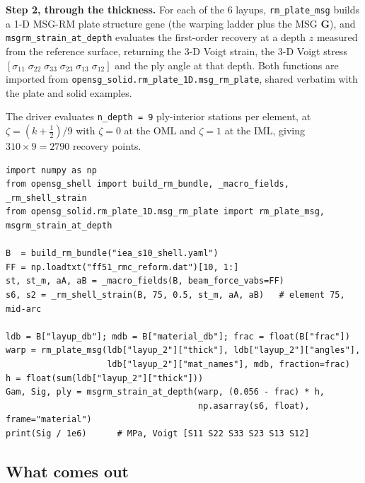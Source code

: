\textbf{Step 2, through the thickness.} For each of the 6 layups,
\texttt{rm\_plate\_msg} builds a 1-D MSG-RM plate structure gene (the warping
ladder plus the MSG $\mathbf{G}$), and \texttt{msgrm\_strain\_at\_depth}
evaluates the first-order recovery at a depth $z$ measured from the reference
surface, returning the 3-D Voigt strain, the 3-D Voigt stress
$[\sigma_{11}\;\sigma_{22}\;\sigma_{33}\;\sigma_{23}\;\sigma_{13}\;\sigma_{12}]$
and the ply angle at that depth. Both functions are imported from
\texttt{opensg\_solid.rm\_plate\_1D.msg\_rm\_plate}, shared verbatim with the
plate and solid examples.

The driver evaluates \texttt{n\_depth = 9} ply-interior stations per element, at
$\zeta = (k + \tfrac12)/9$ with $\zeta = 0$ at the OML and $\zeta = 1$ at the
IML, giving $310 \times 9 = 2790$ recovery points.

\begin{lstlisting}[style=opensg,caption={The recovery chain in miniature: one element, one depth.},basicstyle=\ttfamily\footnotesize]
import numpy as np
from opensg_shell import build_rm_bundle, _macro_fields, _rm_shell_strain
from opensg_solid.rm_plate_1D.msg_rm_plate import rm_plate_msg, msgrm_strain_at_depth

B  = build_rm_bundle("iea_s10_shell.yaml")
FF = np.loadtxt("ff51_rmc_reform.dat")[10, 1:]
st, st_m, aA, aB = _macro_fields(B, beam_force_vabs=FF)
s6, s2 = _rm_shell_strain(B, 75, 0.5, st_m, aA, aB)   # element 75, mid-arc

ldb = B["layup_db"]; mdb = B["material_db"]; frac = float(B["frac"])
warp = rm_plate_msg(ldb["layup_2"]["thick"], ldb["layup_2"]["angles"],
                    ldb["layup_2"]["mat_names"], mdb, fraction=frac)
h = float(sum(ldb["layup_2"]["thick"]))
Gam, Sig, ply = msgrm_strain_at_depth(warp, (0.056 - frac) * h,
                                      np.asarray(s6, float), frame="material")
print(Sig / 1e6)      # MPa, Voigt [S11 S22 S33 S23 S13 S12]
\end{lstlisting}

\subsection{What comes out}

